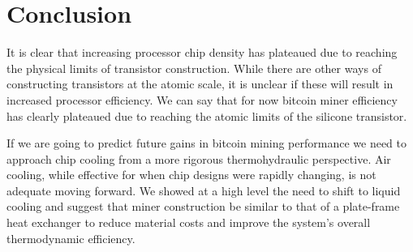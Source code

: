 \documentclass[runningheads]{llncs}
\begin{document}



\section{Conclusion}

It is clear that increasing processor chip density has plateaued due to reaching the physical limits of transistor construction.
While there are other ways of constructing transistors at the atomic scale, it is unclear if these will result in increased processor efficiency.
We can say that for now bitcoin miner efficiency has clearly plateaued due to reaching the atomic limits of the silicone transistor.

If we are going to predict future gains in bitcoin mining performance we need to approach chip cooling from a more rigorous thermohydraulic perspective.
Air cooling, while effective for when chip designs were rapidly changing, is not adequate moving forward.
We showed at a high level the need to shift to liquid cooling and suggest that miner construction be similar to that of a plate-frame heat exchanger to reduce material costs and improve the system's overall thermodynamic efficiency.
\end{document}

